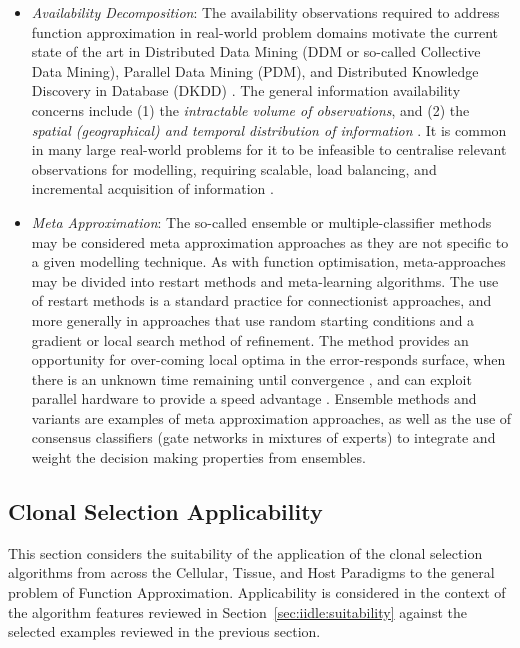 \begin{itemize}
	\item \emph{Availability Decomposition}: The availability observations required to address function approximation in real-world problem domains motivate the current state of the art in Distributed Data Mining (DDM or so-called Collective Data Mining), Parallel Data Mining (PDM), and Distributed Knowledge Discovery in Database (DKDD) \cite{Kargupta2000}. The general information availability concerns include (1) the \emph{intractable volume of observations}, and (2) the \emph{spatial (geographical) and temporal distribution of information} \cite{Zaki1999}. It is common in many large real-world problems for it to be infeasible to centralise relevant observations for modelling, requiring scalable, load balancing, and incremental acquisition of information \cite{Skillicorn1999}. 
	
	\item \emph{Meta Approximation}: The so-called ensemble or multiple-classifier methods may be considered meta approximation approaches as they are not specific to a given modelling technique. As with function optimisation, meta-approaches may be divided into restart methods and meta-learning algorithms. The use of restart methods is a standard practice for connectionist approaches, and more generally in approaches that use random starting conditions and a gradient or local search method of refinement. The method provides an opportunity for over-coming local optima in the error-responds surface, when there is an unknown time remaining until convergence \cite{Magdon-ismail2000}, and can exploit parallel hardware to provide a speed advantage \cite{Blas2005}. Ensemble methods and variants are examples of meta approximation approaches, as well as the use of consensus classifiers (gate networks in mixtures of experts) to integrate and weight the decision making properties from ensembles. 
\end{itemize}


%
%
\subsection{Clonal Selection Applicability}
\label{subsec:iidle:function:approximation:applicability}
This section considers the suitability of the application of the clonal selection algorithms from across the Cellular, Tissue, and Host Paradigms to the general problem of Function Approximation. Applicability is considered in the context of the algorithm features reviewed in Section~\ref{sec:iidle:suitability} against the selected examples reviewed in the previous section.

